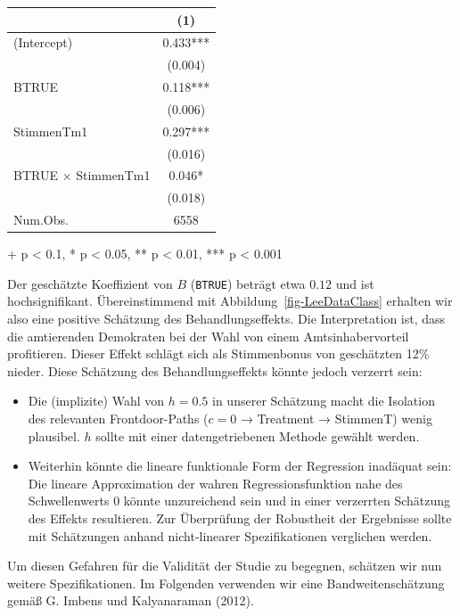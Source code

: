 \documentclass[
  a4paper,
  DIV=11,
  oneside]{scrreprt}
\begin{document}
\begingroup
\fontsize{12.0pt}{14.4pt}\selectfont
\setlength{\LTpost}{0mm}
\begin{longtable*}{lc}
\toprule
  & (1) \\ 
\midrule\addlinespace[2.5pt]
(Intercept) & 0.433*** \\ 
 & (0.004) \\ 
BTRUE & 0.118*** \\ 
 & (0.006) \\ 
StimmenTm1 & 0.297*** \\ 
 & (0.016) \\ 
BTRUE × StimmenTm1 & 0.046* \\ 
{} & {(0.018)} \\ 
Num.Obs. & 6558 \\ 
\bottomrule
\end{longtable*}
\begin{minipage}{\linewidth}
+ p < 0.1, * p < 0.05, ** p < 0.01, *** p < 0.001\\
\end{minipage}
\endgroup

Der geschätzte Koeffizient von \(B\) (\texttt{BTRUE}) beträgt etwa
\(0.12\) und ist hochsignifikant. Übereinstimmend mit
Abbildung~\ref{fig-LeeDataClass} erhalten wir also eine positive
Schätzung des Behandlungseffekts. Die Interpretation ist, dass die
amtierenden Demokraten bei der Wahl von einem Amtsinhabervorteil
profitieren. Dieser Effekt schlägt sich als Stimmenbonus von geschätzten
12\% nieder. Diese Schätzung des Behandlungseffekts könnte jedoch
verzerrt sein:

\begin{itemize}
\item
  Die (implizite) Wahl von \(h=0.5\) in unserer Schätzung macht die
  Isolation des relevanten Frontdoor-Paths (\(c=0\) → Treatment →
  StimmenT) wenig plausibel. \(h\) sollte mit einer datengetriebenen
  Methode gewählt werden.
\item
  Weiterhin könnte die lineare funktionale Form der Regression inadäquat
  sein: Die lineare Approximation der wahren Regressionsfunktion nahe
  des Schwellenwerts \(0\) könnte unzureichend sein und in einer
  verzerrten Schätzung des Effekts resultieren. Zur Überprüfung der
  Robustheit der Ergebnisse sollte mit Schätzungen anhand nicht-linearer
  Spezifikationen verglichen werden.
\end{itemize}

Um diesen Gefahren für die Validität der Studie zu begegnen, schätzen
wir nun weitere Spezifikationen. Im Folgenden verwenden wir eine
Bandweitenschätzung gemäß G. Imbens und Kalyanaraman (2012).
\end{document}
